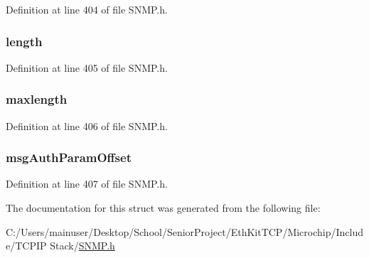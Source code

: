 Definition at line 404 of file S\+N\+M\+P.\+h.

\hypertarget{struct_s_n_m_p_v3_m_s_g_d_a_t_a_ac03f72dfd2e32790101f1221796ea289}{}
\subsubsection[{length}]{ length}\label{struct_s_n_m_p_v3_m_s_g_d_a_t_a_ac03f72dfd2e32790101f1221796ea289}


Definition at line 405 of file S\+N\+M\+P.\+h.

\hypertarget{struct_s_n_m_p_v3_m_s_g_d_a_t_a_a13701c90cc1e4dfdcadc17465ec5553f}{}
\subsubsection[{maxlength}]{ maxlength}\label{struct_s_n_m_p_v3_m_s_g_d_a_t_a_a13701c90cc1e4dfdcadc17465ec5553f}


Definition at line 406 of file S\+N\+M\+P.\+h.

\hypertarget{struct_s_n_m_p_v3_m_s_g_d_a_t_a_a2ed79ec5619d12a3d9314b8b18f5b9be}{}
\subsubsection[{msg\+Auth\+Param\+Offset}]{ msg\+Auth\+Param\+Offset}\label{struct_s_n_m_p_v3_m_s_g_d_a_t_a_a2ed79ec5619d12a3d9314b8b18f5b9be}


Definition at line 407 of file S\+N\+M\+P.\+h.



The documentation for this struct was generated from the following file\+:\begin{DoxyCompactItemize}
\item 
C\+:/\+Users/mainuser/\+Desktop/\+School/\+Senior\+Project/\+Eth\+Kit\+T\+C\+P/\+Microchip/\+Include/\+T\+C\+P\+I\+P Stack/\hyperlink{_s_n_m_p_8h}{S\+N\+M\+P.\+h}\end{DoxyCompactItemize}
